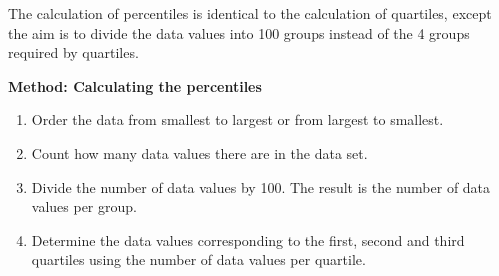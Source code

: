 \documentclass[10pt,a4paper,titlepage,twoside,openright]{report}
\begin{document}
The calculation of percentiles is identical to the calculation of quartiles, except the aim is to divide the data values into 100 groups instead of the 4 groups required by quartiles.

\textbf{Method: Calculating the percentiles}
\begin{enumerate}
\item Order the data from smallest to largest or from largest to smallest.
\item Count how many data values there are in the data set.
\item Divide the number of data values by 100. The result is the number of data values per group.
\item Determine the data values corresponding to the first, second and third quartiles using the number of data values per quartile.
\end{enumerate}
\end{document}
